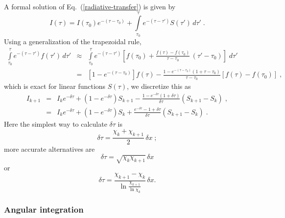 \documentclass[\mydriver,12pt,twoside,notitlepage,a4paper]{article}
\begin{document}
A formal solution of Eq.~(\ref{radiative-transfer}) is given by
\begin{equation}
  I(\tau) = I(\tau_0) e^{-(\tau-\tau_0)}
            + \int\limits_{\tau_0}^\tau e^{-(\tau-\tau')} S(\tau')\,d\tau' \; .
\end{equation}
Using a generalization of the trapezoidal rule,
\begin{eqnarray}
  \int\limits_{\tau_0}^\tau e^{-(\tau-\tau')} f(\tau')\,d\tau'
  &\approx& \int\limits_{\tau_0}^\tau e^{-(\tau-\tau')}
              \left[ f(\tau_0) + \frac{f(\tau){-}f(\tau_0)}{\tau-\tau_0}\,
              (\tau'-\tau_0)\right] \; d\tau'\\
  &=&       \left[1{-}e^{-(\tau-\tau_0)}\right] f(\tau)
          - \frac{1 - e^{-(\tau-\tau_0)}(1+\tau{-}\tau_0)}{\tau-\tau_0}
            [f(\tau)-f(\tau_0)]
  \; ,
\end{eqnarray}
which is exact for linear functions $S(\tau)$, we discretize this as
\begin{eqnarray}
  I_{k+1} &=& I_k e^{-\delta\tau}
              + (1{-}e^{-\delta\tau}) S_{k+1}
              - \frac{1 - e^{-\delta\tau}(1+\delta\tau)}{\delta\tau}
                (S_{k+1}-S_k) \; , \\
          &=& I_k e^{-\delta\tau}
              + (1{-}e^{-\delta\tau}) S_{k}
              + \frac{e^{-\delta\tau}-1+\delta\tau}{\delta\tau}
                (S_{k+1}-S_k) \; .
\end{eqnarray}
Here the simplest way to calculate $\delta\tau$ is
\begin{equation}
  \delta\tau = \frac{\chi_k{+}\chi_{k+1}}{2} \, \delta x \; ;
\end{equation}
more accurate alternatives are
\begin{equation}
  \delta\tau = \sqrt{\chi_k\chi_{k+1}} \, \delta x
\end{equation}
or
\begin{equation}
  \delta\tau
  = \frac{\chi_{k+1}-\chi_k}{\ln\frac{\chi_{k+1}}{\ln\chi_k}} \, \delta x.
\end{equation}


\subsubsection{Angular integration}
\end{document}
